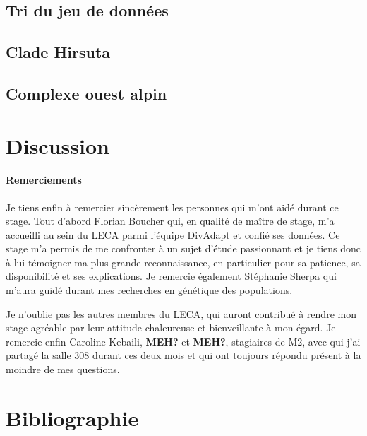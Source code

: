 \documentclass[12pt,a4paper,notitlepage]{article}
\begin{document}
\subsection{Tri du jeu de données}

\lipsum[1-2]

\subsection{Clade Hirsuta}

\lipsum[1]

\subsection{Complexe ouest alpin}

\lipsum[1]

\section{Discussion}

\lipsum[1-4]

\paragraph{Remerciements}
Je tiens enfin à remercier sincèrement les personnes qui m'ont aidé durant ce stage.
Tout d'abord Florian Boucher qui, en qualité de maître de stage, m'a accueilli au sein du LECA parmi l'équipe DivAdapt et confié ses données.
Ce stage m'a permis de me confronter à un sujet d'étude passionnant et je tiens donc à lui témoigner ma plus grande reconnaissance, en particulier pour sa patience, sa disponibilité et ses explications. Je remercie également Stéphanie Sherpa qui m'aura guidé durant mes recherches en génétique des populations.

Je n’oublie pas les autres membres du LECA, qui auront contribué à rendre mon stage agréable par leur attitude chaleureuse et bienveillante à mon égard.
Je remercie enfin Caroline Kebaili, \textbf{MEH?} et \textbf{MEH?}, stagiaires de M2, avec qui j’ai partagé la salle 308 durant ces deux mois et qui ont toujours répondu présent à la moindre de mes questions.

\newpage
\section{Bibliographie}


\end{document}
